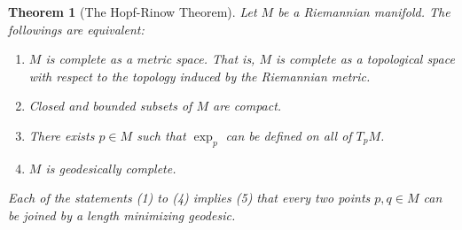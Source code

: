 \documentclass[11pt]{book}
\theoremstyle{break}
\theoremstyle{break}
\newtheorem{thm}{Theorem}[section]
\begin{document}
\begin{thm}[The Hopf-Rinow Theorem]
Let $M$ be a Riemannian manifold. The followings are equivalent:
\begin{enumerate}[topsep=3pt,itemsep=-1ex,partopsep=1ex,parsep=1ex]
\item $M$ is complete as a metric space. That is, $M$ is complete as a topological space with respect to the topology induced by the Riemannian metric. 
\item Closed and bounded subsets of $M$ are compact.
\item There exists $p \in M$ such that $\exp_p$ can be defined on all of $T_pM$.
\item $M$ is geodesically complete. 
\end{enumerate}
Each of the statements (1) to (4) implies (5) that every two points $p,q \in M$ can be joined by a length minimizing geodesic. 
\end{thm}
\end{document}
